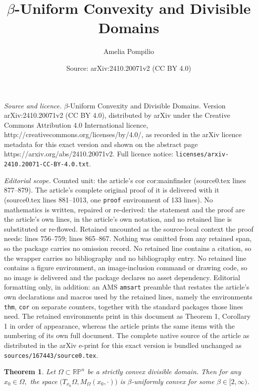 \documentclass[10pt,a4paper]{amsart}
\title{$\beta$-Uniform Convexity and Divisible Domains}
\author{Amelia Pompilio}
\date{Source: arXiv:2410.20071v2 (CC BY 4.0)}
\newtheorem{thm}{Theorem}
\begin{document}
\maketitle

\noindent\emph{Source and licence.} $\beta$-Uniform Convexity and Divisible Domains. Version arXiv:2410.20071v2 (CC BY 4.0), distributed by arXiv under the Creative Commons Attribution 4.0 International licence, http://creativecommons.org/licenses/by/4.0/, as recorded in the arXiv licence metadata for this exact version and shown on the abstract page https://arxiv.org/abs/2410.20071v2. Full licence notice: \texttt{licenses/arxiv-2410.20071-CC-BY-4.0.txt}.\par\smallskip

\noindent\textit{Editorial scope.} Counted unit: the article's cor cor:mainfinsler (source0.tex lines 877--879). The article's complete original proof of it is delivered with it (source0.tex lines 881--1013, one \texttt{proof} environment of 133 lines). No mathematics is written, repaired or re-derived: the statement and the proof are the article's own lines, in the article's own notation, and no retained line is substituted or re-flowed.  Retained uncounted as the source-local context the proof needs: lines 756--759; lines 865--867.  Nothing was omitted from any retained span, so the package carries no omission record.  No retained line contains a citation, so the wrapper carries no bibliography and no bibliography entry.  No retained line contains a figure environment, an image-inclusion command or drawing code, so no image is delivered and the package declares no asset dependency.  Editorial formatting only, in addition: an AMS \texttt{amsart} preamble that restates the article's own declarations and macros used by the retained lines, namely the environments \texttt{thm}, \texttt{cor} on separate counters, together with the standard packages those lines need.  The retained environments print in this document as Theorem 1, Corollary 1 in order of appearance, whereas the article prints the same items with the numbering of its own full document.  The complete native source of the article as distributed in the arXiv e-print for this exact version is bundled unchanged as \texttt{sources/167443/source0.tex}.
\begin{thm}
\label{thm:mainminkowski}
Let $\Omega \subset \mathbb{RP}^n$ be a strictly convex divisible domain. Then for any $x_0 \in \Omega,$ the space $\big(T_{x_0}\Omega, M_\Omega(x_0, \cdot)\big)$ is $\beta$-uniformly convex for some $\beta \in [2, \infty)$.
\end{thm}
\end{document}
